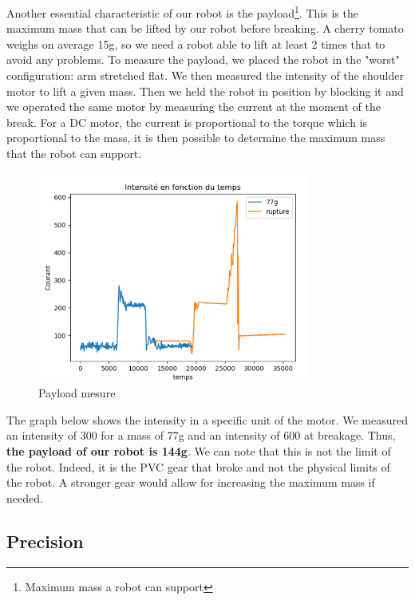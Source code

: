 Another essential characteristic of our robot is the \gls{payload}\footnote{Maximum mass a robot can support}. This is the maximum mass that can be lifted by our robot before breaking. A cherry tomato weighs on average 15g, so we need a robot able to lift at least 2 times that to avoid any problems. To measure the payload, we placed the robot in the "worst" configuration: arm stretched flat. We then measured the intensity of the shoulder motor to lift a given mass. Then we held the robot in position by blocking it and we operated the same motor by measuring the current at the moment of the break. For a DC motor, the current is proportional to the torque which is proportional to the mass, it is then possible to determine the maximum mass that the robot can support. 
\begin{figure}[ht]
    \centering
    \includegraphics[width=0.8\textwidth]{Images/Section04/payload.png}
    \caption{Payload mesure}
    \label{fig:Payload}
\end{figure}
\FloatBarrier

The graph below shows the intensity in a specific unit of the motor. We measured an intensity of 300 for a mass of 77g and an intensity of 600 at breakage. Thus, \textbf{the payload of our robot is 144g}. We can note that this is not the limit of the robot. Indeed, it is the PVC gear that broke and not the physical limits of the robot. A stronger gear would allow for increasing the maximum mass if needed.

\subsection{Precision}

